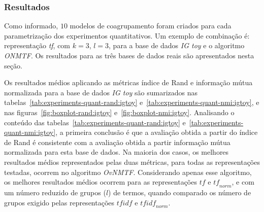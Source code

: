 \documentclass[
    12pt,                %
    oneside,            %
    a4paper,            %
    english,            %
    brazil                %
    ]{abntex2ppgsi}
\begin{document}
\subsubsection{Resultados}
\label{subsec:experiments-quant:results}

Como informado, $10$ modelos de coagrupamento foram criados para cada parametrização dos experimentos quantitativos. Um exemplo de combinação é: representação \textit{tf}, com $k = 3$, $l = 3$, para a base de dados \textit{IG toy} e o algoritmo \textit{ONMTF}. Os resultados para as três bases de dados reais são apresentados nesta seção.


Os resultados médios aplicando as métricas índice de Rand e informação mútua normalizada para a base de dados \textit{IG toy} são sumarizados nas tabelas~\ref{tab:experiments-quant-rand:igtoy} e~\ref{tab:experiments-quant-nmi:igtoy}, e nas figuras~\ref{fig:boxplot-rand:igtoy} e~\ref{fig:boxplot-nmi:igtoy}.
Analisando o conteúdo das tabelas~\ref{tab:experiments-quant-rand:igtoy} e~\ref{tab:experiments-quant-nmi:igtoy}, a primeira conclusão é que a avaliação obtida a partir do índice de Rand é consistente com a avaliação obtida a partir informação mútua normalizada para esta base de dados. Na maioria dos casos, os melhores resultados médios representados pelas duas métricas, para todas as representações testadas, ocorrem no algoritmo \textit{OvNMTF}. Considerando apenas esse algoritmo, os melhores resultados médios ocorrem para as representações $\textit{tf}$ e $\textit{tf}_{norm}$, e com um número reduzido de grupos ($l$) de termos, quando comparado os número de grupos exigido pelas representações $\textit{tfidf}$ e $\textit{tfidf}_{norm}$.
\end{document}
